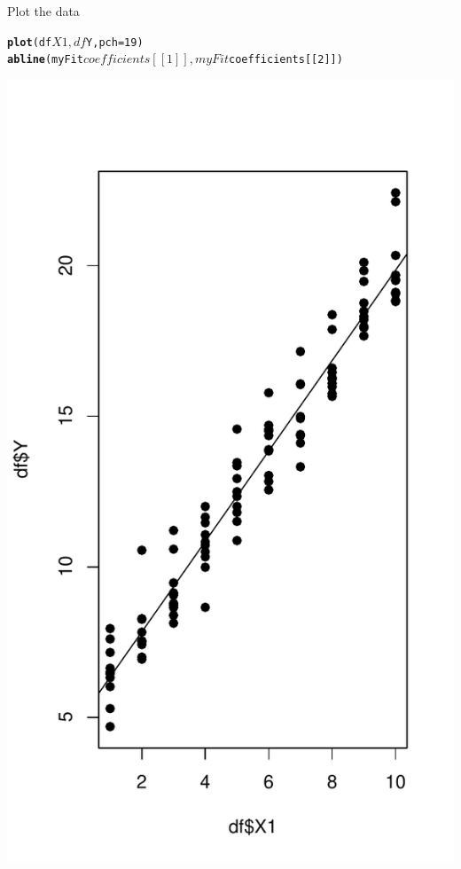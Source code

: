\documentclass[xcolor=dvipsnames]{beamer}\usepackage{graphicx, color}
\makeatletter
\def\maxwidth{ %
  \ifdim\Gin@nat@width>\linewidth
    \linewidth
  \else
    \Gin@nat@width
  \fi
}
\newcommand{\hlfunctioncall}[1]{\textcolor[rgb]{0.501960784313725,0,0.329411764705882}{\textbf{#1}}}%
\newenvironment{kframe}{%
 \def\at@end@of@kframe{}%
 \ifinner\ifhmode%
  \def\at@end@of@kframe{\end{minipage}}%
  \begin{minipage}{\columnwidth}%
 \fi\fi%
 \def\FrameCommand##1{\hskip\@totalleftmargin \hskip-\fboxsep
 \colorbox{shadecolor}{##1}\hskip-\fboxsep
     \hskip-\linewidth \hskip-\@totalleftmargin \hskip\columnwidth}%
 \MakeFramed {\advance\hsize-\width
   \@totalleftmargin\z@ \linewidth\hsize
   \@setminipage}}%
 {\par\unskip\endMakeFramed%
 \at@end@of@kframe}
\newenvironment{knitrout}{}{} %
\makeatother
\begin{document}
\begin{frame}[fragile]{Plot the data}
\begin{knitrout}
\color{fgcolor}\begin{kframe}
\begin{alltt}
\hlfunctioncall{plot}(df$X1, df$Y, pch = 19)
\hlfunctioncall{abline}(myFit$coefficients[[1]], myFit$coefficients[[2]])
\end{alltt}
\end{kframe}
\includegraphics[width=\maxwidth]{figure/UnivariatePlot} 

\end{knitrout}

\end{frame}
\end{document}
